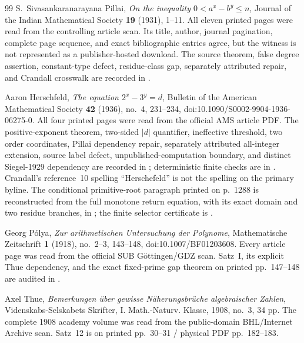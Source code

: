 \begin{thebibliography}{99}
S.~Sivasankaranarayana Pillai,
\emph{On the inequality $0<a^x-b^y\leq n$},
Journal of the Indian Mathematical Society \textbf{19} (1931), 1--11.
All eleven printed pages were read from the controlling article scan.  Its
title, author, journal pagination, complete page sequence, and exact
bibliographic entries agree, but the witness is not represented as a
publisher-hosted download.  The source theorem, false degree assertion,
constant-type defect, residue-class gap, separately attributed repair, and
Crandall crosswalk are recorded in
.

Aaron Herschfeld,
\emph{The equation $2^x-3^y=d$},
Bulletin of the American Mathematical Society \textbf{42} (1936), no.~4,
231--234, doi:10.1090/S0002-9904-1936-06275-0.  All four printed pages were
read from the official AMS article PDF.  The positive-exponent theorem,
two-sided $|d|$ quantifier, ineffective threshold, two order coordinates,
Pillai dependency repair, separately attributed all-integer extension,
source label defect, unpublished-computation boundary, and distinct
Siegel-1929 dependency are recorded in
; deterministic
finite checks are in .  Crandall's
reference~10 spelling ``Herschefeld'' is not the spelling on the primary
byline.  The conditional primitive-root paragraph printed on p.~1288 is
reconstructed from the full monotone return equation, with its exact domain
and two residue branches, in
; the finite selector
certificate is .

Georg P\'olya,
\emph{Zur arithmetischen Untersuchung der Polynome},
Mathematische Zeitschrift \textbf{1} (1918), no.~2--3, 143--148,
doi:10.1007/BF01203608.  Every article page was read from the official SUB
G\"ottingen/GDZ scan.  Satz~I, its explicit Thue dependency, and the exact
fixed-prime gap theorem on printed pp.~147--148 are audited in
.

Axel Thue,
\emph{Bemerkungen \"uber gewisse N\"aherungsbr\"uche algebraischer Zahlen},
Videnskabs-Selskabets Skrifter, I. Math.-Naturv. Klasse, 1908, no.~3,
34 pp.  The complete 1908 academy volume was read from the public-domain
BHL/Internet Archive scan.  Satz~12 is on printed pp.~30--31 / physical PDF
pp.~182--183.


\end{thebibliography}
